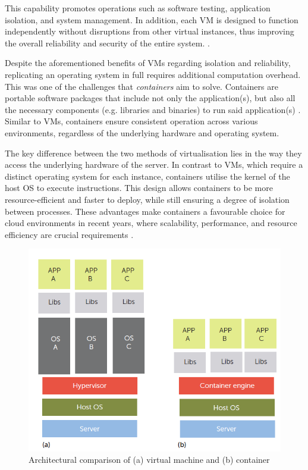 This capability promotes operations such as software testing, application isolation, and system management. In addition, each VM is designed to function independently without disruptions from other virtual instances, thus improving the overall reliability and security of the entire system. \cite{goldbergSurveyVirtualMachine1974}.

Despite the aforementioned benefits of VMs regarding isolation and reliability, replicating an operating system in full requires additional computation overhead. This was one of the challenges that \textit{containers} aim to solve. Containers are portable software packages that include not only the application(s), but also all the necessary components (e.g. libraries and binaries) to run said application(s) \cite{bernsteinContainersCloudLXC2014}. Similar to VMs, containers ensure consistent operation across various environments, regardless of the underlying hardware and operating system.

The key difference between the two methods of virtualisation lies in the way they access the underlying hardware of the server. In contrast to VMs, which require a distinct operating system for each instance, containers utilise the kernel of the host OS to execute instructions. This design allows containers to be more resource-efficient and faster to deploy, while still ensuring a degree of isolation between processes. These advantages make containers a favourable choice for cloud environments in recent years, where scalability, performance, and resource efficiency are crucial requirements \cite{bernsteinContainersCloudLXC2014, felterUpdatedPerformanceComparison2015}.

\begin{figure}
    \centering
    \includegraphics[width=0.7\linewidth]{resources/eea3da004befcc5437960cbc868be634.png}
    \caption{Architectural comparison of (a) virtual machine and (b) container \cite{bernsteinContainersCloudLXC2014}}
    \label{fig:vms-vs-containers}
\end{figure}

